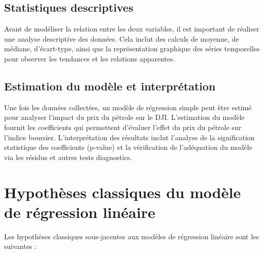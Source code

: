 \documentclass[a4paper,12pt]{article}
\begin{document}
	\subsection{Statistiques descriptives}
	
	Avant de modéliser la relation entre les deux variables, il est important de réaliser une analyse descriptive des données. Cela inclut des calculs de moyenne, de médiane, d'écart-type, ainsi que la représentation graphique des séries temporelles pour observer les tendances et les relations apparentes.
	
	\subsection{Estimation du modèle et interprétation}
	
	Une fois les données collectées, un modèle de régression simple peut être estimé pour analyser l'impact du prix du pétrole sur le DJI. L'estimation du modèle fournit les coefficients qui permettent d’évaluer l'effet du prix du pétrole sur l'indice boursier. L'interprétation des résultats inclut l'analyse de la signification statistique des coefficients (p-value) et la vérification de l’adéquation du modèle via les résidus et autres tests diagnostics.
	
	
	\section{Hypothèses classiques du modèle de régression linéaire}
	
	Les hypothèses classiques sous-jacentes aux modèles de régression linéaire sont les suivantes :
	
\end{document}
